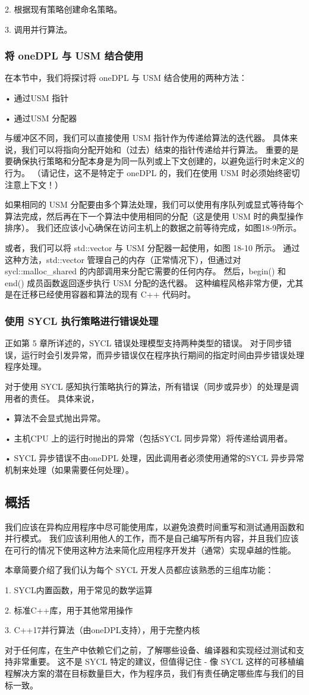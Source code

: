 2. 根据现有策略创建命名策略。

3. 调用并行算法。

\subsubsection{将 oneDPL 与 USM 结合使用}
在本节中，我们将探讨将 oneDPL 与 USM 结合使用的两种方法：

• 通过USM 指针

• 通过USM 分配器

与缓冲区不同，我们可以直接使用 USM 指针作为传递给算法的迭代器。 具体来说，我们可以将指向分配开始和（过去）结束的指针传递给并行算法。 重要的是要确保执行策略和分配本身是为同一队列或上下文创建的，以避免运行时未定义的行为。 （请记住，这不是特定于 oneDPL 的，我们在使用 USM 时必须始终密切注意上下文！）

如果相同的 USM 分配要由多个算法处理，我们可以使用有序队列或显式等待每个算法完成，然后再在下一个算法中使用相同的分配（这是使用 USM 时的典型操作排序）。 我们还应该小心确保在访问主机上的数据之前等待完成，如图18-9所示。

或者，我们可以将 std::vector 与 USM 分配器一起使用，如图 18-10 所示。 通过这种方法，std::vector 管理自己的内存（正常情况下），但通过对 sycl::malloc\_shared 的内部调用来分配它需要的任何内存。 然后，begin() 和 end() 成员函数返回逐步执行 USM 分配的迭代器。 这种编程风格非常方便，尤其是在迁移已经使用容器和算法的现有 C++ 代码时。

\subsubsection{使用 SYCL 执行策略进行错误处理}
正如第 5 章所详述的，SYCL 错误处理模型支持两种类型的错误。 对于同步错误，运行时会引发异常，而异步错误仅在程序执行期间的指定时间由异步错误处理程序处理。

对于使用 SYCL 感知执行策略执行的算法，所有错误（同步或异步）的处理是调用者的责任。 具体来说，

• 算法不会显式抛出异常。

• 主机CPU 上的运行时抛出的异常（包括SYCL 同步异常）将传递给调用者。

• SYCL 异步错误不由oneDPL 处理，因此调用者必须使用通常的SYCL 异步异常机制来处理（如果需要任何处理）。

\subsection{概括}
我们应该在异构应用程序中尽可能使用库，以避免浪费时间重写和测试通用函数和并行模式。 我们应该利用他人的工作，而不是自己编写所有内容，并且我们应该在可行的情况下使用这种方法来简化应用程序开发并（通常）实现卓越的性能。

本章简要介绍了我们认为每个 SYCL 开发人员都应该熟悉的三组库功能：

1. SYCL内置函数，用于常见的数学运算

2. 标准C++库，用于其他常用操作

3. C++17并行算法（由oneDPL支持），用于完整内核

对于任何库，在生产中依赖它们之前，了解哪些设备、编译器和实现经过测试和支持非常重要。 这不是 SYCL 特定的建议，但值得记住 - 像 SYCL 这样的可移植编程解决方案的潜在目标数量巨大，作为程序员，我们有责任确定哪些库与我们的目标一致。